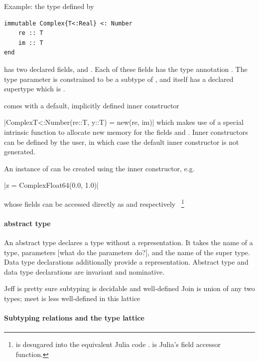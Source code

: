 \documentclass[pldi]{sigplanconf-pldi15}
\begin{document}
Example: the  type defined by

\begin{verbatim}
immutable Complex{T<:Real} <: Number
    re :: T
    im :: T
end
\end{verbatim}

has two declared fields,  and . Each of these fields has the
type annotation . The type parameter  is constrained to be a
subtype of , and  itself has a declared supertype
which is .

 comes with a default, implicitly defined inner constructor

|Complex{T<:Number}(re::T, y::T) = new(re, im)|
%
which makes use of a special intrinsic function  to allocate new
memory for the fields  and . Inner constructors can be
defined by the user, in which case the default inner constructor is not
generated.

An instance of  can be created using the inner constructor, e.g.\

|z = Complex{Float64}(0.0, 1.0)|

whose fields can be accessed directly as  and  respectively~
\footnote{ is desugared into the equivalent Julia code .
 is Julia's field accessor function.}


\paragraph{abstract type}
An abstract type declares a type without a representation. It takes the name of
a type, parameters [what do the parameters do?], and the name of the super
type. Data type declarations additionally provide a representation.  Abstract type and data type declarations are
invariant and nominative.

Jeff is pretty sure subtyping is decidable and well-defined
Join is union of any two types; meet is less well-defined in this lattice

\paragraph{Subtyping relations and the type lattice}
\end{document}
